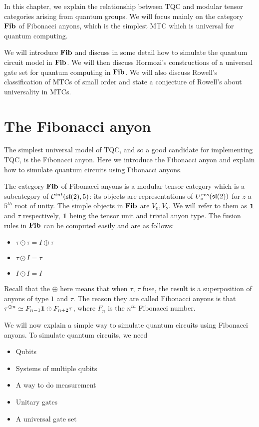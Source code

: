 In this chapter, we explain the relationship between TQC and modular tensor
categories arising from quantum groups. We will focus mainly on the category
$\mathbf{Fib}$ of Fibonacci anyons, which is the simplest MTC which is universal for
quantum computing. 

We will introduce $\mathbf{Fib}$ and discuss in some detail how to simulate the quantum
circuit model in $\mathbf{Fib}$. We will then discuss Hormozi's constructions of a
universal gate set for quantum computing in $\mathbf{Fib}$. We will also discuss
Rowell's classification of MTCs of small order and state a conjecture of
Rowell's about universality in MTCs.

\section{The Fibonacci anyon}
The simplest universal model of TQC, and so a good candidate for implementing TQC, is the Fibonacci anyon. Here we introduce the Fibonacci anyon
and explain how to simulate quantum circuits using Fibonacci anyons.

The category $\mathbf{Fib}$ of Fibonacci anyons is a modular tensor category which is a
subcategory of $\mathcal{C}^{int}(\mathfrak{sl}(2),5)$: its objects are representations
of $U_z^{res}(\mathfrak{sl}(2))$ for $z$ a $5^{th}$ root of unity. The simple objects in 
$\mathbf{Fib}$ are $V_0, V_2$. We will refer to them as $\mathbf{1}$ and $\tau$
respectively, $\mathbf{1}$ being the tensor unit and trivial anyon type. The
fusion rules in $\mathbf{Fib}$ can be computed easily and are as follows:

\begin{itemize}
    \item $\tau \odot \tau = I \oplus \tau$
    \item $\tau \odot I = \tau$
    \item $I \odot I = I$
\end{itemize}
Recall that the $\oplus$ here means that when $\tau$, $\tau$ fuse, the result
is a superposition of anyons of type $1$ and $\tau$.  The reason they are
called Fibonacci anyons is that $\tau^{\odot n} \simeq F_{n-1} \mathbf{1} \oplus F_{n+2}
\tau$, where $F_n$ is the $n^{th}$ Fibonacci number.

We will now explain a simple way to simulate quantum circuits using Fibonacci
anyons. To simulate quantum circuits, we need

\begin{itemize}
\item Qubits
\item Systems of multiple qubits
\item A way to do measurement
\item Unitary gates
\item A universal gate set
\end{itemize}

